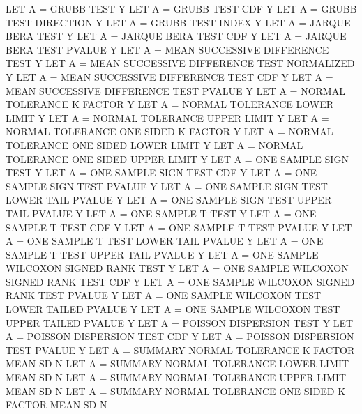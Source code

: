 {          LET A = GRUBB TEST                                    Y
          LET A = GRUBB TEST CDF                                Y
          LET A = GRUBB TEST DIRECTION                          Y
          LET A = GRUBB TEST INDEX                              Y
          LET A = JARQUE BERA TEST                              Y
          LET A = JARQUE BERA TEST CDF                          Y
          LET A = JARQUE BERA TEST PVALUE                       Y
          LET A = MEAN SUCCESSIVE DIFFERENCE TEST               Y
          LET A = MEAN SUCCESSIVE DIFFERENCE TEST NORMALIZED    Y
          LET A = MEAN SUCCESSIVE DIFFERENCE TEST CDF           Y
          LET A = MEAN SUCCESSIVE DIFFERENCE TEST PVALUE        Y
          LET A = NORMAL TOLERANCE K FACTOR                     Y
          LET A = NORMAL TOLERANCE LOWER LIMIT                  Y
          LET A = NORMAL TOLERANCE UPPER LIMIT                  Y
          LET A = NORMAL TOLERANCE ONE SIDED K FACTOR           Y
          LET A = NORMAL TOLERANCE ONE SIDED LOWER LIMIT        Y
          LET A = NORMAL TOLERANCE ONE SIDED UPPER LIMIT        Y
          LET A = ONE SAMPLE SIGN TEST                          Y
          LET A = ONE SAMPLE SIGN TEST CDF                      Y
          LET A = ONE SAMPLE SIGN TEST PVALUE                   Y
          LET A = ONE SAMPLE SIGN TEST LOWER TAIL PVALUE        Y
          LET A = ONE SAMPLE SIGN TEST UPPER TAIL PVALUE        Y
          LET A = ONE SAMPLE T TEST                             Y
          LET A = ONE SAMPLE T TEST CDF                         Y
          LET A = ONE SAMPLE T TEST PVALUE                      Y
          LET A = ONE SAMPLE T TEST LOWER TAIL PVALUE           Y
          LET A = ONE SAMPLE T TEST UPPER TAIL PVALUE           Y
          LET A = ONE SAMPLE WILCOXON SIGNED RANK TEST          Y
          LET A = ONE SAMPLE WILCOXON SIGNED RANK TEST CDF      Y
          LET A = ONE SAMPLE WILCOXON SIGNED RANK TEST PVALUE   Y
          LET A = ONE SAMPLE WILCOXON TEST LOWER TAILED PVALUE  Y
          LET A = ONE SAMPLE WILCOXON TEST UPPER TAILED PVALUE  Y
          LET A = POISSON DISPERSION TEST                       Y
          LET A = POISSON DISPERSION TEST CDF                   Y
          LET A = POISSON DISPERSION TEST PVALUE                Y
          LET A = SUMMARY NORMAL TOLERANCE K FACTOR             MEAN SD N
          LET A = SUMMARY NORMAL TOLERANCE LOWER LIMIT          MEAN SD N
          LET A = SUMMARY NORMAL TOLERANCE UPPER LIMIT          MEAN SD N
          LET A = SUMMARY NORMAL TOLERANCE ONE SIDED K FACTOR   MEAN SD N
}

